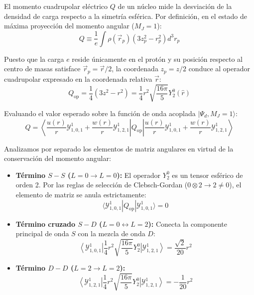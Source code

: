 \begin{problema}
El momento cuadrupolar eléctrico $Q$ de un núcleo mide la desviación de la densidad de carga respecto a la simetría esférica. Por definición, en el estado de máxima proyección del momento angular ($M_J = 1$):
\begin{equation}
Q \equiv \frac{1}{e} \int \rho(\vec{r}_p) \left( 3 z_p^2 - r_p^2 \right) d^3r_p
\end{equation}

Puesto que la carga $e$ reside únicamente en el protón y su posición respecto al centro de masas satisface $\vec{r}_p = \vec{r}/2$, la coordenada $z_p = z/2$ conduce al operador cuadrupolar expresado en la coordenada relativa $\vec{r}$:
\begin{equation}
Q_{\text{op}} = \frac{1}{4} \left( 3 z^2 - r^2 \right) = \frac{1}{4} r^2 \sqrt{\frac{16\pi}{5}} Y_2^0(\hat{r})
\end{equation}

Evaluando el valor esperado sobre la función de onda acoplada $|\Psi_d, M_J=1\rangle$:
\begin{equation}
Q = \left\langle \frac{u(r)}{r} \mathcal{Y}_{1,0,1}^1 + \frac{w(r)}{r} \mathcal{Y}_{1,2,1}^1 \right| Q_{\text{op}} \left| \frac{u(r)}{r} \mathcal{Y}_{1,0,1}^1 + \frac{w(r)}{r} \mathcal{Y}_{1,2,1}^1 \right\rangle
\end{equation}

Analizamos por separado los elementos de matriz angulares en virtud de la conservación del momento angular:
\begin{itemize}
    \item \textbf{Término $S-S$ ($L=0 \to L=0$):} El operador $Y_2^0$ es un tensor esférico de orden 2. Por las reglas de selección de Clebsch-Gordan ($0 \otimes 2 \to 2 \neq 0$), el elemento de matriz se anula estrictamente:
    \begin{equation}
    \langle \mathcal{Y}_{1,0,1}^1 | Q_{\text{op}} | \mathcal{Y}_{1,0,1}^1 \rangle = 0
    \end{equation}
    \item \textbf{Término cruzado $S-D$ ($L=0 \leftrightarrow L=2$):} Conecta la componente principal de onda $S$ con la mezcla de onda $D$:
    \begin{equation}
    \left\langle \mathcal{Y}_{1,0,1}^1 \right| \frac{1}{4} r^2 \sqrt{\frac{16\pi}{5}} Y_2^0 \left| \mathcal{Y}_{1,2,1}^1 \right\rangle = \frac{\sqrt{2}}{20} r^2
    \end{equation}
    \item \textbf{Término $D-D$ ($L=2 \to L=2$):}
    \begin{equation}
    \left\langle \mathcal{Y}_{1,2,1}^1 \right| \frac{1}{4} r^2 \sqrt{\frac{16\pi}{5}} Y_2^0 \left| \mathcal{Y}_{1,2,1}^1 \right\rangle = -\frac{1}{20} r^2
    \end{equation}
\end{itemize}


\end{problema}
